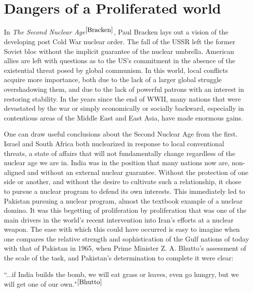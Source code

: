 \documentclass[journal]{IEEEtran}
\begin{document}
\section{Dangers of a Proliferated world}
In \textit{The Second Nuclear Age}$^{\cite{Bracken}}$, Paul Bracken lays out a vision of the developing post Cold War nuclear order.  The fall of the USSR left the former Soviet bloc without the implicit guarantee of the nuclear umbrella.  American allies are left with questions as to the US's commitment in the absence of the existential threat posed by global communism.  In this world, local conflicts acquire more importance, both due to the lack of a larger global struggle overshadowing them, and due to the lack of powerful patrons with an interest in restoring stability.  In the years since the end of WWII, many nations that were devastated by the war or simply economically or socially backward, especially in contentious areas of the Middle East and East Asia, have made enormous gains.\par
One can draw useful conclusions about the Second Nuclear Age from the first.  Israel and South Africa both nuclearized in response to local conventional threats, a state of affairs that will not fundamentally change regardless of the nuclear age we are in.  India was in the position that many nations now are, non-aligned and without an external nuclear guarantee.  Without the protection of one side or another, and without the desire to cultivate such a relationship, it chose to pursue a nuclear program to defend its own interests.  This immediately led to Pakistan pursuing a nuclear program, almost the textbook example of a nuclear domino.  It was this begetting of proliferation by proliferation that was one of the main drivers in the world's recent intervention into Iran's efforts at a nuclear weapon.  The ease with which this could have occurred is easy to imagine when one compares the relative strength and sophistication of the Gulf nations of today with that of Pakistan in 1965, when Prime Minister Z. A. Bhutto's assessment of the scale of the task, and Pakistan's determination to complete it were clear:
\vspace{10mm}
\begin{adjustwidth}{10mm}{10mm}
``...if India builds the bomb, we will eat grass or leaves, even go hungry, but we will get one of our own."$^{\cite{Bhutto}}$\\
\end{adjustwidth}\par
\end{document}
